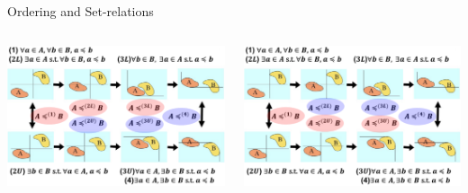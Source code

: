 \documentclass[aspectratio=169, dvipdfmx, 11pt]{beamer}
\begin{document}
\begin{frame}{Ordering and Set-relations}
  \centering
  \begin{columns}
    \begin{column}{0.48\textwidth}
      \centering
      \includegraphics[keepaspectratio, scale=0.25]{figures/eps/case1_set_relations.eps}
    \end{column}
    \begin{column}{0.48\textwidth}
      \centering
      \includegraphics[keepaspectratio, scale=0.25]{figures/eps/case2_set_relations.eps}
    \end{column}
  \end{columns}
\end{frame}
\end{document}
